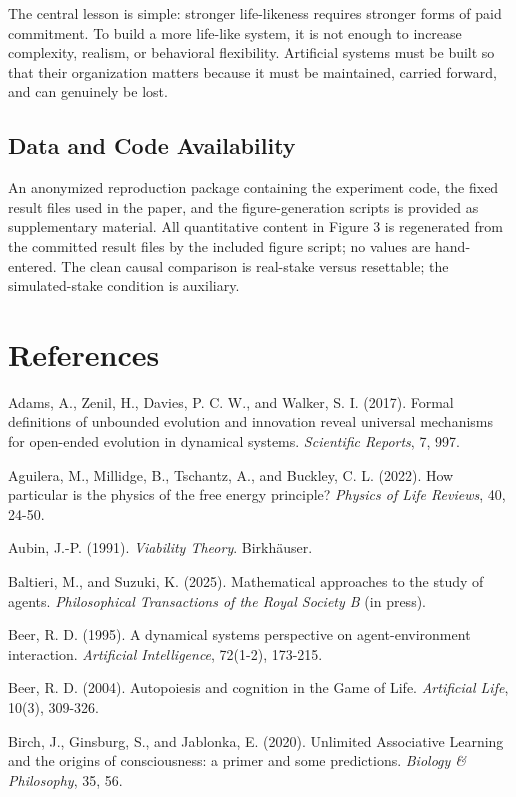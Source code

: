 \documentclass[Afour,sageh,times,doublespace]{sagej}
\begin{document}
The central lesson is simple: stronger life-likeness requires stronger forms of paid commitment. To build a more life-like system, it is not enough to increase complexity, realism, or behavioral flexibility. Artificial systems must be built so that their organization matters because it must be maintained, carried forward, and can genuinely be lost.

\subsection{Data and Code Availability}\label{data-and-code-availability}

An anonymized reproduction package containing the experiment code, the fixed result files used in the paper, and the figure-generation scripts is provided as supplementary material. All quantitative content in Figure 3 is regenerated from the committed result files by the included figure script; no values are hand-entered. The clean causal comparison is real-stake versus resettable; the simulated-stake condition is auxiliary.

\section*{References}

Adams, A., Zenil, H., Davies, P. C. W., and Walker, S. I. (2017). Formal definitions of unbounded evolution and innovation reveal universal mechanisms for open-ended evolution in dynamical systems. \emph{Scientific Reports}, 7, 997.

Aguilera, M., Millidge, B., Tschantz, A., and Buckley, C. L. (2022). How particular is the physics of the free energy principle? \emph{Physics of Life Reviews}, 40, 24-50.

Aubin, J.-P. (1991). \emph{Viability Theory}. Birkhäuser.

Baltieri, M., and Suzuki, K. (2025). Mathematical approaches to the study of agents. \emph{Philosophical Transactions of the Royal Society B} (in press).

Beer, R. D. (1995). A dynamical systems perspective on agent-environment interaction. \emph{Artificial Intelligence}, 72(1-2), 173-215.

Beer, R. D. (2004). Autopoiesis and cognition in the Game of Life. \emph{Artificial Life}, 10(3), 309-326.

Birch, J., Ginsburg, S., and Jablonka, E. (2020). Unlimited Associative Learning and the origins of consciousness: a primer and some predictions. \emph{Biology \& Philosophy}, 35, 56.
\end{document}
